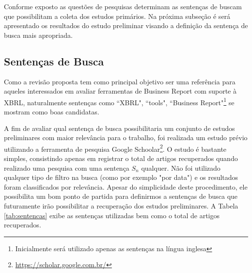 \documentclass{article}
\begin{document}
Conforme exposto as questões de pesquisas determinam as sentenças de
buscam que possibilitam a coleta dos estudos primários. Na próxima
subseção é será apresentado os resultados do estudo preliminar visando
a definição da sentença de busca mais apropriada.

\subsection{Sentenças de Busca}
\label{subsec:setences}

Como a revisão proposta tem como principal objetivo ser uma referência para aqueles interessados em avaliar ferramentas de Business Report com suporte à XBRL, naturalmente sentenças como ``XBRL", ``tools", ``Business Report"\footnote{Inicialmente será utilizado apenas as sentenças na língua inglesa} se mostram como boas candidatas. 

A fim de avaliar qual sentença de busca possibilitaria um conjunto de
estudos preliminares com maior relevância para o trabalho, foi
realizada um estudo prévio utilizando a ferramenta de pesquisa Google
Schoolar\footnote{\url{https://scholar.google.com.br/}}. O estudo é
bastante simples, consistindo apenas em registrar o total de artigos
recuperados quando realizado uma pesquisa com uma sentença $S_n$
qualquer. Não foi utilizado qualquer tipo de filtro na busca (como por
exemplo "por data") e os resultados foram classificados por
relevância. Apesar do simplicidade deste procedimento, ele possibilita
um bom ponto de partida para definirmos a sentenças de busca que
futuramente irão possibilitar a recuperação dos estudos preliminares. 
A Tabela \ref{tab:sentencas} exibe as sentenças utilizadas bem como o total de artigos recuperados.
\begin{table}[htb]
\centering
{}
\caption{Total de artigos por sentença}
\label{tab:sentencas}
\end{table}
\end{document}
